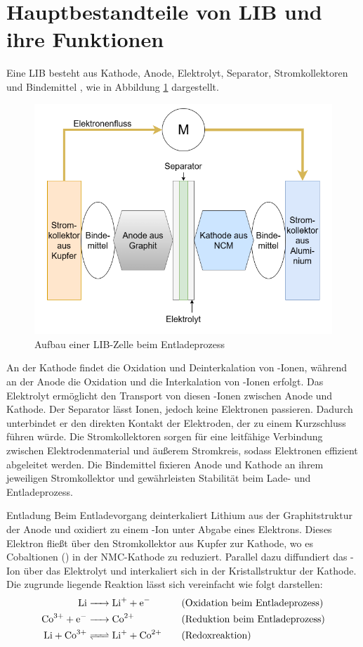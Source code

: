 \section{Hauptbestandteile von LIB und ihre Funktionen}
Eine LIB besteht aus Kathode, Anode, Elektrolyt, Separator, Stromkollektoren und Bindemittel \cite{urlIdAufbauBatterie}, wie in Abbildung \ref{fig:aufbau-nmc-zelle} dargestellt. 
\begin{figure}[H]
	\centering
	\includegraphics[height=0.4\linewidth]{resources/images/aufbau-nmc-zelle}
	\caption{Aufbau einer LIB-Zelle beim Entladeprozess \cite{articleAlterungLithiumBatterien}}
	\label{fig:aufbau-nmc-zelle}
\end{figure}

An der Kathode findet die Oxidation und Deinterkalation von -Ionen, während an der Anode die Oxidation und die Interkalation von -Ionen erfolgt. Das Elektrolyt ermöglicht den Transport von diesen -Ionen zwischen Anode und Kathode. Der Separator lässt Ionen, jedoch keine Elektronen passieren. Dadurch unterbindet er den direkten Kontakt der Elektroden, der zu einem Kurzschluss führen würde. Die Stromkollektoren sorgen für eine leitfähige Verbindung zwischen Elektrodenmaterial und äußerem Stromkreis, sodass Elektronen effizient abgeleitet werden. Die Bindemittel fixieren Anode und Kathode an ihrem jeweiligen Stromkollektor und gewährleisten Stabilität beim Lade- und Entladeprozess.

Entladung
Beim Entladevorgang deinterkaliert Lithium aus der Graphitstruktur der Anode und oxidiert zu einem -Ion unter Abgabe eines Elektrons. Dieses Elektron fließt über den Stromkollektor aus Kupfer zur Kathode, wo es Cobaltionen () in der NMC-Kathode zu  reduziert. Parallel dazu diffundiert das -Ion über das Elektrolyt und interkaliert sich in der Kristallstruktur der Kathode. Die zugrunde liegende Reaktion lässt sich vereinfacht wie folgt darstellen:
\begin{align*}
    \ce{Li &-> Li+ + e-}              &\quad& \text{(Oxidation beim Entladeprozess)} \\
    \ce{Co^{3+} + e- &-> Co^{2+}}     &\quad& \text{(Reduktion beim Entladeprozess)} \\
    \ce{Li + Co^{3+} &<=> Li^+ + Co^{2+}} &\quad& \text{(Redoxreaktion)}
\end{align*}

